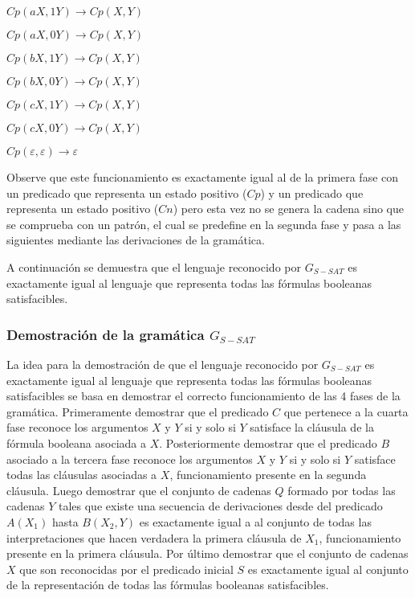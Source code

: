 \documentclass[12pt]{article}
\begin{document}
\begin{itemize}
\begin{enumerate}[start=23]
\begin{multicols}{2}
                  \item $Cp(aX,1Y) \to Cp(X,Y)$
                  \item $Cp(aX,0Y) \to Cp(X,Y)$
                  \item $Cp(bX,1Y) \to Cp(X,Y)$
                  \item $Cp(bX,0Y) \to Cp(X,Y)$
                  \item $Cp(cX,1Y) \to Cp(X,Y)$
                  \item $Cp(cX,0Y) \to Cp(X,Y)$
                  \item $Cp(\varepsilon,\varepsilon)\to \varepsilon$
              \end{multicols}
          \end{enumerate}

          Observe que este funcionamiento es exactamente igual al de la primera fase con un predicado que
          representa un estado positivo ($Cp$) y un predicado que representa un estado positivo ($Cn$)
          pero esta vez no se genera la cadena sino que se comprueba con un patrón, el cual se predefine
          en la segunda fase y pasa a las siguientes mediante las derivaciones de la gramática.

\end{itemize}

A continuación se demuestra que el lenguaje reconocido por $G_{S-SAT}$ es exactamente igual al lenguaje que representa
todas las fórmulas booleanas satisfacibles.

\subsubsection{Demostración de la gramática $G_{S-SAT}$}

La idea para la demostración de que el lenguaje reconocido por $G_{S-SAT}$ es exactamente igual al lenguaje que representa
todas las fórmulas booleanas satisfacibles se basa en demostrar el correcto funcionamiento de las 4 fases de la gramática. Primeramente
demostrar que el predicado $C$ que pertenece a la cuarta fase reconoce los argumentos $X$ y $Y$ si y solo si
$Y$ satisface la cláusula de la fórmula booleana asociada a $X$. Posteriormente demostrar que el predicado $B$ asociado
a la tercera fase reconoce los argumentos $X$ y $Y$ si y solo si $Y$ satisface todas las cláusulas asociadas a $X$, funcionamiento presente en la segunda cláusula.
Luego demostrar que el conjunto de cadenas $Q$ formado por todas las cadenas $Y$ tales que existe una secuencia de
derivaciones desde del predicado $A(X_1)$ hasta $B(X_2,Y)$ es exactamente igual a al conjunto de todas las interpretaciones
que hacen verdadera la primera cláusula de $X_1$, funcionamiento presente en la primera cláusula. Por último demostrar que el
conjunto de cadenas $X$ que son reconocidas por el predicado inicial $S$ es exactamente igual al conjunto de la
representación de todas las fórmulas booleanas satisfacibles.
\end{document}
